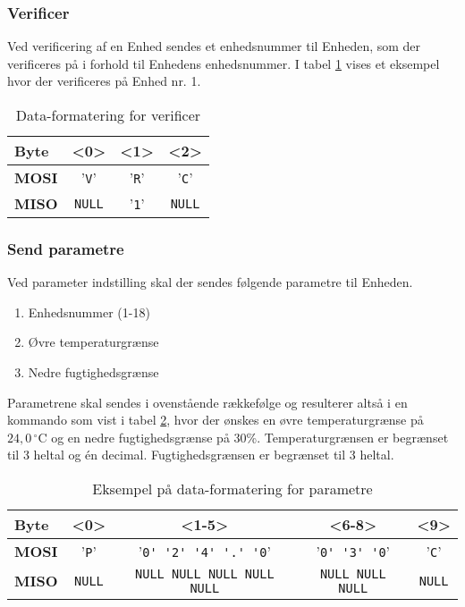 \subsubsection{Verificer}

Ved verificering af en Enhed sendes et enhedsnummer til Enheden, som der verificeres på i forhold til Enhedens enhedsnummer. I tabel \ref{table:SWProtokol-verificer} vises et eksempel hvor der verificeres på Enhed nr. 1.

\begin{table}[H]
	\caption{Data-formatering for verificer}
	\centering
	\begin{tabular}{|l|c|c|c|}
		\hline 
		\textbf{Byte} & \textbf{<0>} & \textbf{<1>} & \textbf{<2>}   \\ 
		\hline 
		\textbf{MOSI} & '\verb+V+' & '\verb+R+' & '\verb+C+' \\ 
		\hline 
		\textbf{MISO} & \verb+NULL+ & '\verb+1+' & \verb+NULL+ \\ 
		\hline 
	\end{tabular} 
	\label{table:SWProtokol-verificer}
\end{table}

\subsubsection{Send parametre}

Ved parameter indstilling skal der sendes følgende parametre til Enheden.

\begin{enumerate}
	\item Enhedsnummer (1-18)
	\item Øvre temperaturgrænse
	\item Nedre fugtighedsgrænse
\end{enumerate}

Parametrene skal sendes i ovenstående rækkefølge og resulterer altså i en kommando som vist i tabel \ref{table:SWProtokol-para}, hvor der ønskes en øvre temperaturgrænse på $24,0\,^{\circ}\mathrm{C}$ og en nedre fugtighedsgrænse på 30\%. Temperaturgrænsen er begrænset til 3 heltal og én decimal. Fugtighedsgrænsen er begrænset til 3 heltal.

\begin{table}[H]
	\caption{Eksempel på data-formatering for parametre}
	\centering
	\begin{tabular}{|l|c|c|c|c|}
		\hline 
		\textbf{Byte} & \textbf{<0>} & \textbf{<1-5>} & \textbf{<6-8>} & \textbf{<9>} \\ 
		\hline 
		\textbf{MOSI} & '\verb+P+' & '\verb+0' '2' '4' '.' '0+' & '\verb+0' '3' '0+' & '\verb+C+' \\ 
		\hline 
		\textbf{MISO} & \verb+NULL+ & \verb+NULL NULL NULL NULL NULL+ & \verb+NULL NULL NULL+ & \verb+NULL+\\ 
		\hline 
	\end{tabular} 
	\label{table:SWProtokol-para}
\end{table}

